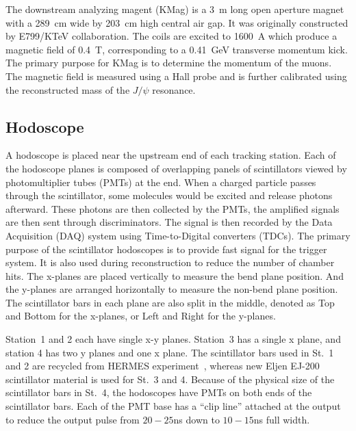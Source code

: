 \documentclass[../main.tex]{subfiles}
\begin{document}
The downstream analyzing magent (KMag) is a \SI{3}{\meter} long open aperture magnet
with a \SI{289}{\cm} wide by \SI{203}{\cm} high central air gap. It was
originally  constructed by E799/KTeV collaboration\cite{alavi-harati2003}.
The coils are excited to \SI{1600}{\ampere} which produce a magnetic field of \SI{0.4}{\tesla},
corresponding to a \SI{0.41}{\GeV} transverse momentum kick. The primary purpose for
KMag is to determine the momentum of the muons. The magnetic field is measured using a Hall
probe and is further calibrated using the reconstructed mass of the $J/\psi$ resonance.


\subsection{Hodoscope}
A hodoscope is placed near the upstream end of each tracking station. Each of the hodoscope planes
is composed of overlapping panels of scintillators viewed by photomultiplier tubes (PMTs) at the end.
When a charged particle passes through the scintillator, some molecules would be excited and
release photons afterward. These photons are then collected by the PMTs, the amplified signals are
then sent through discriminators. The signal is then recorded by the Data Acquisition (DAQ) system
using Time-to-Digital converters (TDCs).
The primary purpose of the scintillator hodoscopes is to provide fast signal for the
trigger system. It is also used during reconstruction to reduce the number of chamber hits.
The x-planes are placed vertically to measure the bend plane position.
And the y-planes are arranged horizontally to measure the non-bend plane position.
The scintillator bars in each plane are also split in the middle, denoted as Top and Bottom
for the x-planes, or Left and Right for the y-planes.

Station~1 and 2 each have single x-y planes. Station~3 has a single x plane, and station
4 has two y planes and one x plane. The scintillator bars used in St.~1 and 2 are recycled
from HERMES experiment~\cite{ackerstaff1998a}, whereas new Eljen EJ-200 scintillator material
is used for St.~3 and 4. Because of the physical size of the scintillator bars in St.~4, the
hodoscopes have PMTs on both ends of the scintillator bars. Each of the PMT base has a
``clip line'' attached at the output to reduce the output pulse from $20-25$\unit{\ns}
down to $10-15$\unit{\ns} full width.
\end{document}
